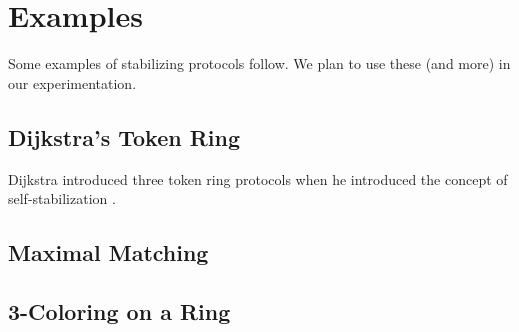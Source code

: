 \section{Examples}
Some examples of stabilizing protocols follow.
We plan to use these (and more) in our experimentation.

\subsection{Dijkstra's Token Ring}
Dijkstra introduced three token ring protocols when he introduced the concept of self-stabilization \cite{dij}.

\subsection{Maximal Matching}

\subsection{3-Coloring on a Ring}






